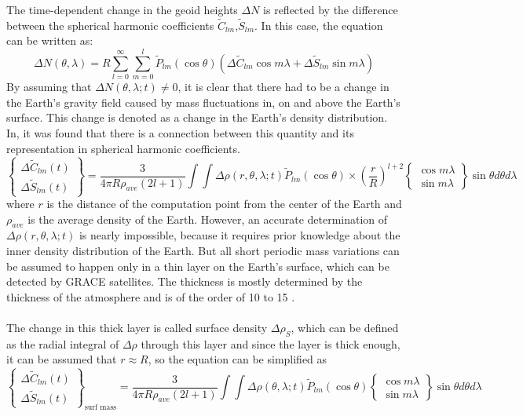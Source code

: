 The time-dependent change in the geoid heights $\Delta N$ is reflected by the difference between the spherical harmonic coefficients $\tilde{C}_{lm}$,$\tilde{S}_{lm}$. In this case, the equation can be written as:
\begin{equation}
\Delta N(\theta, \lambda) = R \sum_{l=0}^{\infty} \sum_{m=0}^{l} \tilde{P}_{lm}(\cos \theta)(\Delta \tilde{C}_{lm} \cos m\lambda + \Delta \tilde{S}_{lm}\sin m\lambda)
\end{equation}
By assuming that $\Delta N(\theta, \lambda;t) \neq 0$, it is clear that there had to be a change in the Earth's gravity field caused by mass fluctuations in, on and above the Earth's surface. This change is denoted as a change in the Earth's density distribution. In\cite{wahr1998time}, it was found that there is a connection between this quantity and its representation in spherical harmonic coefficients.
\begin{equation}
	\begin{Bmatrix}
	\Delta \tilde{C}_{lm}(t)\\
	\Delta \tilde{S}_{lm}(t)
	\end{Bmatrix} = \frac{3}{4\pi R \rho_{ave}(2l+1)} \int \int \Delta \rho(r,\theta,\lambda;t) \tilde{P}_{lm}(\cos \theta) \times (\frac{r}{R})^{l+2} \begin{Bmatrix}
	\cos m\lambda \\
	\sin m\lambda
	\end{Bmatrix} \sin\theta d\theta d\lambda
\end{equation}
where $r$ is the distance of the computation point from the center of the Earth and $\rho_{ave}$ is the average density of the Earth. However, an accurate determination of $\Delta \rho(r,\theta,\lambda;t)$ is nearly impossible, because it requires prior knowledge about the inner density distribution of the Earth. But all short periodic mass variations can be assumed to happen only in a thin layer on the Earth's surface, which can be detected by GRACE satellites. The thickness is mostly determined by the thickness of the atmosphere and is of the order of 10 to 15  \cite{wahr1998time}. \\\\
The change in this thick layer is called surface density $\Delta \rho_{S}$, which can be defined as the radial integral of $\Delta \rho$ through this layer and since the layer is thick enough, it can be assumed that $r \approx R$, so the equation can be simplified as
\begin{equation}
	\begin{Bmatrix}
	\Delta \tilde{C}_{lm}(t)\\
	\Delta \tilde{S}_{lm}(t)
	\end{Bmatrix}_{\text{surf mass}} = \frac{3}{4\pi R \rho_{ave}(2l+1)} \int \int \Delta \rho(\theta,\lambda;t) \tilde{P}_{lm}(\cos \theta)  
	\begin{Bmatrix}
	\cos m\lambda \\
	\sin m\lambda
	\end{Bmatrix} \sin\theta d\theta d\lambda
\end{equation}
